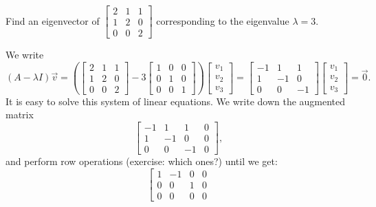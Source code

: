 \begin{example}
Find an eigenvector of
$\left[ \begin{smallmatrix}
2 & 1 & 1 \\
1 & 2 & 0 \\
0 & 0 & 2
\end{smallmatrix} \right]$ corresponding to the eigenvalue $\lambda = 3$.
\end{example}

\begin{exampleSol}
We write
\begin{equation*}
(A-\lambda I) \vec{v} = 
\left(
\begin{bmatrix}
2 & 1 & 1 \\
1 & 2 & 0 \\
0 & 0 & 2
\end{bmatrix}
- 3
\begin{bmatrix}
1 & 0 & 0 \\
0 & 1 & 0 \\
0 & 0 & 1
\end{bmatrix}
\right)
\begin{bmatrix}
v_1 \\ v_2 \\ v_3
\end{bmatrix}
=
\begin{bmatrix}
-1 & 1 & 1 \\
1 & -1 & 0 \\
0 & 0 & -1
\end{bmatrix}
\begin{bmatrix}
v_1 \\ v_2 \\ v_3
\end{bmatrix}
=
\vec{0} .
\end{equation*}
It is easy to solve this system of linear equations.  We write down the
augmented matrix
\begin{equation*}
\left[
\begin{array}{ccc|c}
-1 & 1 & 1 & 0 \\
1 & -1 & 0 & 0 \\
0 & 0 & -1 & 0
\end{array}
\right] ,
\end{equation*}
and perform row operations (exercise: which ones?) until we get:
\begin{equation*}
\left[
\begin{array}{ccc|c}
1 & -1 & 0 & 0 \\
0 & 0 & 1 & 0 \\
0 & 0 & 0 & 0
\end{array}

\end{equation*}
\end{exampleSol}
